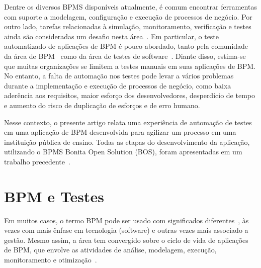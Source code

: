 \documentclass[12pt]{article}
\begin{document}
Dentre os diversos BPMS disponíveis atualmente, é comum encontrar ferramentas com suporte a modelagem, configuração e execução de processos de negócio. Por outro lado, tarefas relacionadas à simulação, monitoramento, verificação e testes ainda são consideradas um desafio nesta área~\cite{aalst2013survey}. Em particular, o teste automatizado de aplicações de BPM é pouco abordado, tanto pela comunidade da área de BPM~\cite{aalst2013survey} como da área de testes de software~\cite{graham2012experiences}. Diante disso, estima-se que muitas organizações se limitem a testes manuais em suas aplicações de BPM. No entanto, a falta de automação nos testes pode levar a vários problemas durante a implementação e execução de processos de negócio, como baixa aderência aos requisitos, maior esforço dos desenvolvedores, desperdício de tempo e aumento do risco de duplicação de esforços e de erro humano. 

Nesse contexto, o presente artigo relata uma experiência de automação de testes em uma aplicação de BPM desenvolvida para agilizar um processo em uma instituição pública de ensino. Todas as etapas do desenvolvimento da aplicação, utilizando o BPMS Bonita Open Solution (BOS), foram apresentadas em um trabalho precedente~\cite{sbsi2013}. 


\section{BPM e Testes}

Em muitos casos, o termo BPM pode ser usado com significados diferentes~\cite{acmxrds2009}, às vezes com mais ênfase em tecnologia (software) e outras vezes mais associado a gestão. Mesmo assim, a área tem convergido sobre o ciclo de vida de aplicações de BPM, que envolve as atividades de análise, modelagem, execução, monitoramento e otimização~\cite{ABPMP}. 

\end{document}

